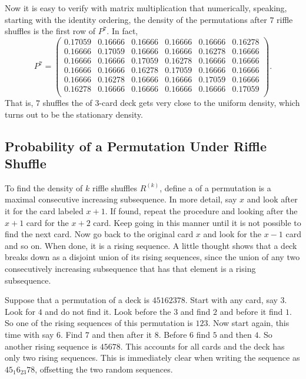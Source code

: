 \documentclass[12pt]{article}
\begin{document}
Now it is easy to verify with matrix multiplication that numerically,
speaking, starting with the identity ordering, the density of the
permutations after \( 7 \) riffle shuffles is the first row of \( P^7 \).
In fact,
\[
    P^7 =
    \begin{pmatrix}
        0.17059 & 0.16666       & 0.16666       & 0.16666       &
        0.16666 & 0.16278 \\
        0.16666 & 0.17059       & 0.16666       & 0.16666       &
        0.16278 & 0.16666 \\
        0.16666 & 0.16666       & 0.17059       & 0.16278       &
        0.16666 & 0.16666 \\
        0.16666 & 0.16666       & 0.16278       & 0.17059       &
        0.16666 & 0.16666 \\
        0.16666 & 0.16278       & 0.16666       & 0.16666       &
        0.17059 & 0.16666 \\
        0.16278 & 0.16666       & 0.16666       & 0.16666       &
        0.16666 & 0.17059 \\
    \end{pmatrix}
    .
\] That is, \( 7 \) shuffles the of 3-card deck gets very close to the
uniform density, which turns out to be the stationary density.

\subsection*{Probability of a Permutation Under Riffle Shuffle}

To find the density of \( k \) riffle shuffles \( R^{(k)} \), define a
%
of a permutation is a maximal consecutive increasing subsequence.  In
more detail, say \( x \) and look after it for the card labeled \( x+1 \).
If found, repeat the procedure and looking after the \( x+1 \) card for
the \( x+2 \) card.  Keep going in this manner until it is not possible
to find the next card.  Now go back to the original card \( x \) and
look for the \( x-1 \) card and so on.  When done, it is a rising
sequence.  A little thought shows that a deck breaks down as a disjoint
union of its rising sequences, since the union of any two consecutively
increasing subsequence that has that element is a rising subsequence.

\begin{example}
    Suppose that a permutation of a deck is \( 45162378 \).  Start with
    any card, say \( 3 \).  Look for \( 4 \) and do not find it.  Look
    before the \( 3 \) and find \( 2 \) and before it find \( 1 \).  So
    one of the rising sequences of this permutation is \( 123 \).  Now
    start again, this time with say \( 6 \).  Find \( 7 \) and then
    after it \( 8 \).  Before \( 6 \) find \( 5 \) and then \( 4 \).  So
    another rising sequence is \( 45678 \).  This accounts for all cards
    and the deck has only two rising sequences.  This is immediately
    clear when writing the sequence as \( 45_{1}6_{23}78 \), offsetting
    the two random sequences.
\end{example}
\end{document}
